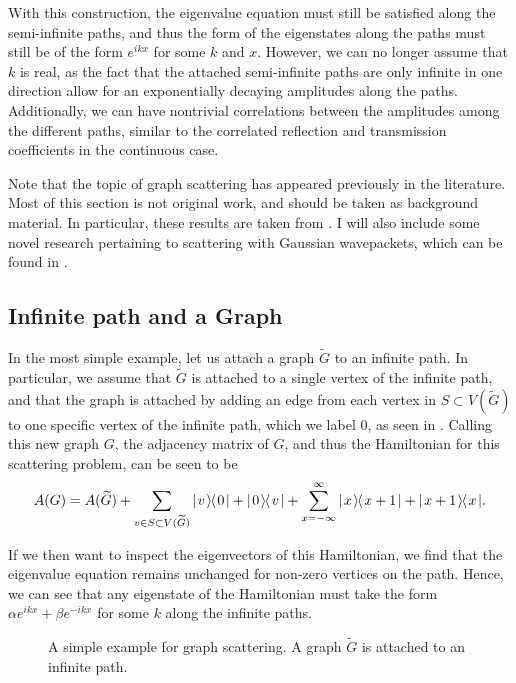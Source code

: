 \documentclass[../thesis-main/thesis-main]{subfiles}
\begin{document}
With this construction, the eigenvalue equation must still be satisfied along the semi-infinite paths, and thus the form of the eigenstates along the paths must still be of the form $e^{i k x}$ for some $k$ and $x$.  However, we can no longer assume that $k$ is real, as the fact that the attached semi-infinite paths are only infinite in one direction allow for an exponentially decaying amplitudes along the paths.  Additionally, we can have nontrivial correlations between the amplitudes among the different paths, similar to the correlated reflection and transmission coefficients in the continuous case.

Note that the topic of graph scattering has appeared previously in the literature.  Most of this section is not original work, and should be taken as background material.  In particular, these results are taken from \cite{FGG08, Chi09, CS11, CG12}.  I will also include some novel research pertaining to scattering with Gaussian wavepackets, which can be found in .


\subsection{Infinite path and a Graph}\label{sec:infinite_path_and_graph}

In the most simple example, let us attach a graph $\widetilde{G}$ to an infinite path.  In particular, we assume that $\widetilde{G}$ is attached to a single vertex of the infinite path, and that the graph is attached by adding an edge from each vertex in $S\subset V(\widetilde{G})$ to one specific vertex of the infinite path, which we label $0$, as seen in .  Calling this new graph $G$, the adjacency matrix of $G$, and thus the Hamiltonian for this scattering problem, can be seen to be
\begin{equation}
  A(G) = A(\widetilde{G}) + \sum_{v\in S \subset V(\widetilde{G})} |\mspace{2mu} v \mspace{2mu} \rangle\mspace{-2mu}\langle\mspace{2mu} 0 \mspace{2mu} | + |\mspace{2mu} 0 \mspace{2mu} \rangle\mspace{-2mu}\langle\mspace{2mu} v \mspace{2mu} | + \sum_{x=-\infty}^\infty |\mspace{2mu} x \mspace{2mu} \rangle\mspace{-2mu}\langle\mspace{2mu} x+1 \mspace{2mu} | + |\mspace{2mu} x+1 \mspace{2mu} \rangle\mspace{-2mu}\langle\mspace{2mu} x \mspace{2mu} |.
\end{equation}

If we then want to inspect the eigenvectors of this Hamiltonian, we find that the eigenvalue equation remains unchanged for non-zero vertices on the path.  Hence, we can see that any eigenstate of the Hamiltonian must take the form $\alpha e^{i k x} + \beta e^{-i k x}$ for some $k$ along the infinite paths.  


\begin{figure}
  \centering
  
  \caption[Simple example for graph scattering]{A simple example for graph scattering.  A graph $\widetilde{G}$ is attached to an infinite path.}
  \label{fig:path_and_graph}
\end{figure}
\end{document}
